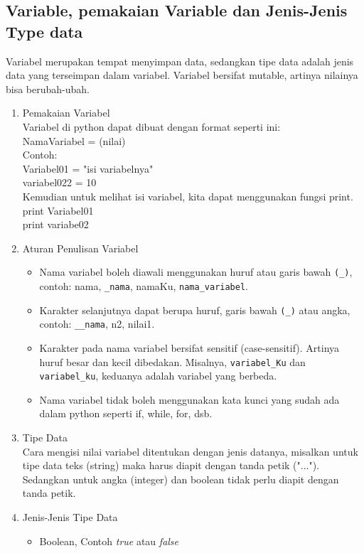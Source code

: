 \begin{enumerate}
\subsection{Variable, pemakaian Variable dan Jenis-Jenis Type data}
Variabel merupakan tempat menyimpan data, sedangkan tipe data adalah jenis data yang terseimpan dalam variabel. Variabel bersifat mutable, artinya nilainya bisa berubah-ubah.
\begin{enumerate}
\item Pemakaian Variabel\\
Variabel di python dapat dibuat dengan format seperti ini:\\
NamaVariabel = (nilai)\\
Contoh:\\
Variabel01 = "isi variabelnya"\\
variabel022 = 10\\
Kemudian untuk melihat isi variabel, kita dapat menggunakan fungsi print.\\
print Variabel01\\
print variabe02\\
\item Aturan Penulisan Variabel
\begin{itemize}
\item Nama variabel boleh diawali menggunakan huruf atau garis bawah \verb|(_)|, contoh: nama, \verb|_nama|, namaKu, \verb|nama_variabel|.
\item Karakter selanjutnya dapat berupa huruf, garis bawah \verb|(_)| atau angka, contoh: \verb|__nama|, n2, nilai1.
\item Karakter pada nama variabel bersifat sensitif (case-sensitif). Artinya huruf besar dan kecil dibedakan. Misalnya, \verb|variabel_Ku| dan \verb|variabel_ku|, keduanya adalah variabel yang berbeda.
\item Nama variabel tidak boleh menggunakan kata kunci yang sudah ada dalam python seperti if, while, for, dsb.
\end{itemize}
\item Tipe Data\\
Cara mengisi nilai variabel ditentukan dengan jenis datanya, misalkan untuk tipe data teks (string) maka harus diapit dengan tanda petik ("..."). Sedangkan untuk angka (integer) dan boolean tidak perlu diapit dengan tanda petik.\\
\item Jenis-Jenis Tipe Data\\
\begin{itemize}
\item Boolean, Contoh \textit{true} atau \textit{false}

\end{itemize}
\end{enumerate}
\end{enumerate}
